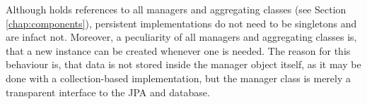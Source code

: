 Although  holds references to all managers and aggregating classes (see Section \ref{chap:components}), persistent implementations do not need to be singletons and are infact not.
Moreover, a peculiarity of all managers and aggregating classes is, that a new instance can be created whenever one is needed.
The reason for this behaviour is, that data is not stored inside the manager object itself, as it may be done with a collection-based implementation, but the manager class is merely a transparent interface to the JPA and database.\\


